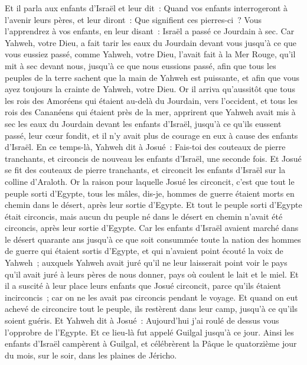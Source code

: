 \begin{multicols}{2}
Et il parla aux enfants d'Israël et leur dit~: Quand vos enfants interrogeront à l'avenir leurs pères, et leur diront~: Que signifient ces pierres-ci~?
Vous l'apprendrez à vos enfants, en leur disant~: Israël a passé ce Jourdain à sec.
Car Yahweh, votre Dieu, a fait tarir les eaux du Jourdain devant vous jusqu'à ce que vous eussiez passé, comme Yahweh, votre Dieu, l'avait fait à la Mer Rouge, qu'il mit à sec devant nous, jusqu'à ce que nous eussions passé,
afin que tous les peuples de la terre sachent que la main de Yahweh est puissante, et afin que vous ayez toujours la crainte de Yahweh, votre Dieu.
\VerseOne{}Or il arriva qu'aussitôt que tous les rois des Amoréens qui étaient au-delà du Jourdain, vers l'occident, et tous les rois des Cananéens qui étaient près de la mer, apprirent que Yahweh avait mis à sec les eaux du Jourdain devant les enfants d'Israël, jusqu'à ce qu'ils eussent passé, leur cœur fondit, et il n'y avait plus de courage en eux à cause des enfants d'Israël.
En ce temps-là, Yahweh dit à Josué~: Fais-toi des couteaux de pierre tranchants, et circoncis de nouveau les enfants d'Israël, une seconde fois.
Et Josué se fit des couteaux de pierre tranchants, et circoncit les enfants d'Israël sur la colline d'Araloth.
Or la raison pour laquelle Josué les circoncit, c'est que tout le peuple sorti d'Egypte, tous les mâles, dis-je, hommes de guerre étaient morts en chemin dans le désert, après leur sortie d'Egypte.
Et tout le peuple sorti d'Egypte était circoncis, mais aucun du peuple né dans le désert en chemin n'avait été circoncis, après leur sortie d'Egypte.
Car les enfants d'Israël avaient marché dans le désert quarante ans jusqu'à ce que soit consummée toute la nation des hommes de guerre qui étaient sortis d'Egypte, et qui n'avaient point écouté la voix de Yahweh~; auxquels Yahweh avait juré qu'il ne leur laisserait point voir le pays qu'il avait juré à leurs pères de nous donner, pays où coulent le lait et le miel.
Et il a suscité à leur place leurs enfants que Josué circoncit, parce qu'ils étaient incirconcis~; car on ne les avait pas circoncis pendant le voyage.
Et quand on eut achevé de circoncire tout le peuple, ils restèrent dans leur camp, jusqu'à ce qu'ils soient guéris.
Et Yahweh dit à Josué~: Aujourd'hui j'ai roulé de dessus vous l'opprobre de l'Egypte. Et ce lieu-là fut appelé Guilgal jusqu'à ce jour.
Ainsi les enfants d'Israël campèrent à Guilgal, et célébrèrent la Pâque le quatorzième jour du mois, sur le soir, dans les plaines de Jéricho.

\end{multicols}
